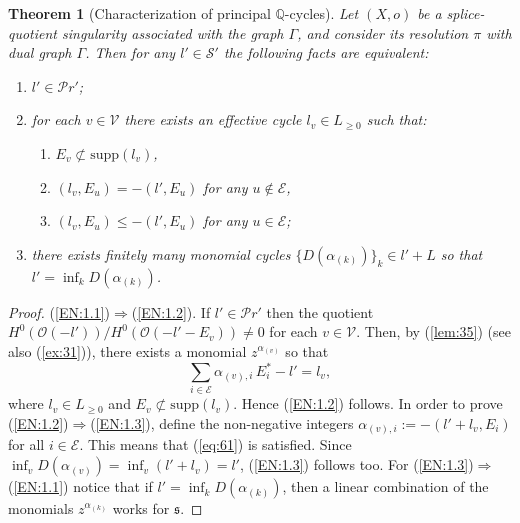 \documentclass[10pt,a4paper]{amsart}
\numberwithin{equation}{section}
\numberwithin{equation}{subsection}
\theoremstyle{plain}
\newtheorem{theorem}[equation]{Theorem}
\theoremstyle{definition}
\begin{document}
\begin{theorem}[Characterization of principal ${\mathbb{Q}}$-cycles]\label{th:61}
Let $(X,o)$ be a splice-quotient singularity associated with the
graph $\Gamma$, and consider its resolution $\pi$ with dual graph
$\Gamma$. Then for any $l'\in{\mathcal{S}}'$ the following facts are
equivalent:

\begin{enumerate}\label{EN:1}
\item\label{EN:1.1}
$l'\in{\mathcal Pr}'$;
\item\label{EN:1.2}
for each $v\in {\mathcal{V}}$ there exists an effective cycle $l_v\in
L_{\geq 0}$ such that:
\begin{enumerate}\label{en:1}
\item\label{en:1.1}
$E_v\not\subset \mathrm{supp}(l_v)$,
\item\label{en:1.2}
$(l_v,E_u)=-(l',E_u)$ for any $u\not\in{\mathcal{E}}$,
\item\label{en:1.3}
$(l_v,E_u)\leq -(l',E_u)$ for any $u\in{\mathcal{E}}$;
\end{enumerate}
\item\label{EN:1.3}
there exists finitely many monomial cycles
$\{D(\alpha_{(k)})\}_k\in l'+L$ so that
$l'=\inf_kD(\alpha_{(k)})$.
\end{enumerate}
\end{theorem}
\begin{proof} (\ref{EN:1.1})$\Rightarrow$(\ref{EN:1.2}).
If $l'\in {\mathcal Pr}'$ then the quotient
$H^0({\mathcal{O}}(-l'))/H^0({\mathcal{O}}(-l'-E_v))\not=0$ for each $v\in{\mathcal{V}}$.
Then, by (\ref{lem:35}) (see also (\ref{ex:31})), there exists a
monomial $z^{\alpha_{(v)}}$ so that
\begin{equation}\label{eq:61}
\sum_{i\in{\mathcal{E}}}\alpha_{(v),i}\,E_i^*-l'=l_v,
\end{equation}
where $l_v\in L_{\geq 0}$ and $E_v\not\subset \mathrm{supp}(l_v)$.
Hence (\ref{EN:1.2}) follows. In order to prove
(\ref{EN:1.2})$\Rightarrow$(\ref{EN:1.3}), define the non-negative
integers $\alpha_{(v),i}:=-(l'+l_v,E_i)$ for all $i\in{\mathcal{E}}$. This
means that (\ref{eq:61}) is satisfied. Since $\inf_v
D(\alpha_{(v)})=\inf_v(l'+l_v)=l'$, (\ref{EN:1.3}) follows too.
For  (\ref{EN:1.3})$\Rightarrow$(\ref{EN:1.1}) notice that if
$l'=\inf_kD(\alpha_{(k)})$, then a linear combination of the
monomials $z^{\alpha_{(k)}}$ works for ${\mathfrak{s}}$.
\end{proof}
\end{document}
